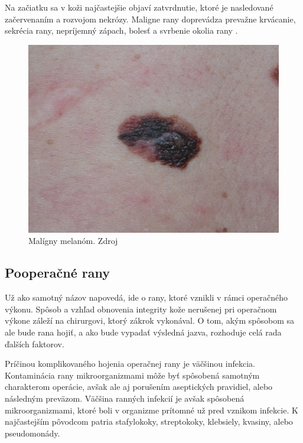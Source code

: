 Na začiatku sa v koži najčastejšie objaví zatvrdnutie, ktoré je nasledované začervenaním a rozvojom nekrózy. Maligne rany doprevádza prevažne krvácanie, sekrécia rany, nepríjemný zápach, bolesť a svrbenie okolia rany \cite{pcCdSrbbhhlr5YcQ, Hlinkova2015}.
\begin{figure}[h]
  \centering
  \includegraphics[scale=0.20]{fig/maligna-rana.png}
  \caption{Malígny melanóm. Zdroj \cite{Svehlik2012}}
  \label{fig:maligny-melanom}
\end{figure}

\subsection{Pooperačné rany}
Už ako samotný názov napovedá, ide o rany, ktoré vznikli v rámci operačného výkonu. Spôsob a vzhľad obnovenia integrity kože nerušenej pri operačnom výkone záleží na chirurgovi, ktorý zákrok vykonával. O tom, akým spôsobom sa ale bude rana hojiť, a ako bude vypadať výsledná jazva, rozhoduje celá rada ďalších faktorov.

Príčinou komplikovaného hojenia operačnej rany je väčšinou infekcia. Kontaminácia rany mikroorganizmami môže byť spôsobená samotným charakterom operácie, avšak ale aj porušením aseptických pravidiel, alebo následným preväzom. Väčšina ranných infekcií je avšak spôsobená mikroorganizmami, ktoré boli v organizme prítomné už pred vznikom infekcie. K najčastejším pôvodcom patria stafylokoky, streptokoky, klebsiely, kvasiny, alebo pseudomonády.

